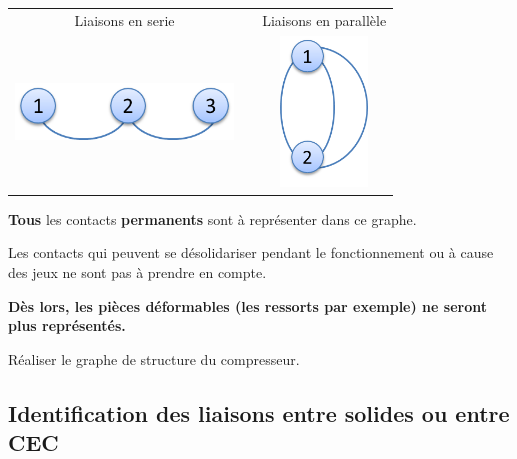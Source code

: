 \documentclass[10pt,oneside]{article}
\begin{document}
\begin{defi}
\begin{center}
\begin{tabular}{ccc}
Liaisons en serie & & Liaisons en parallèle\\
\includegraphics[height=1.5cm]{png/serie.png}
&
&
\includegraphics[height=4cm]{png/parallele.png}\\
\end{tabular}
\end{center}
\end{defi}

\begin{rem}
\textbf{Tous} les contacts \textbf{permanents} sont à représenter dans ce graphe.

Les contacts qui peuvent se désolidariser pendant le fonctionnement ou à cause des jeux ne sont pas à prendre en compte. 

\textbf{Dès lors, les pièces déformables (les ressorts par exemple) ne seront plus représentés.}
\end{rem}

\begin{exemple}
Réaliser le graphe de structure du compresseur.
\end{exemple}

\subsection{Identification des liaisons entre solides ou entre CEC}
\end{document}

